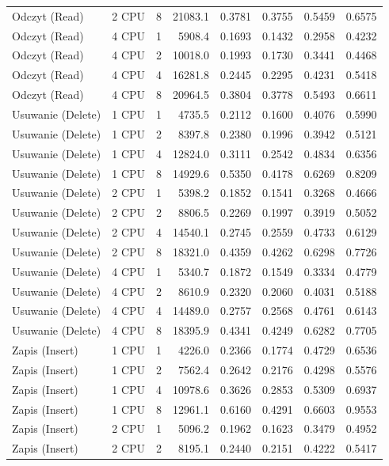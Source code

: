 \begin{table}[ht]
{\begin{tabular}{llcrrrrr}
Odczyt (Read) & 2 CPU & 8 & 21083.1 & 0.3781 & 0.3755 & 0.5459 & 0.6575 \\
Odczyt (Read) & 4 CPU & 1 & 5908.4 & 0.1693 & 0.1432 & 0.2958 & 0.4232 \\
Odczyt (Read) & 4 CPU & 2 & 10018.0 & 0.1993 & 0.1730 & 0.3441 & 0.4468 \\
Odczyt (Read) & 4 CPU & 4 & 16281.8 & 0.2445 & 0.2295 & 0.4231 & 0.5418 \\
Odczyt (Read) & 4 CPU & 8 & 20964.5 & 0.3804 & 0.3778 & 0.5493 & 0.6611 \\
Usuwanie (Delete) & 1 CPU & 1 & 4735.5 & 0.2112 & 0.1600 & 0.4076 & 0.5990 \\
Usuwanie (Delete) & 1 CPU & 2 & 8397.8 & 0.2380 & 0.1996 & 0.3942 & 0.5121 \\
Usuwanie (Delete) & 1 CPU & 4 & 12824.0 & 0.3111 & 0.2542 & 0.4834 & 0.6356 \\
Usuwanie (Delete) & 1 CPU & 8 & 14929.6 & 0.5350 & 0.4178 & 0.6269 & 0.8209 \\
Usuwanie (Delete) & 2 CPU & 1 & 5398.2 & 0.1852 & 0.1541 & 0.3268 & 0.4666 \\
Usuwanie (Delete) & 2 CPU & 2 & 8806.5 & 0.2269 & 0.1997 & 0.3919 & 0.5052 \\
Usuwanie (Delete) & 2 CPU & 4 & 14540.1 & 0.2745 & 0.2559 & 0.4733 & 0.6129 \\
Usuwanie (Delete) & 2 CPU & 8 & 18321.0 & 0.4359 & 0.4262 & 0.6298 & 0.7726 \\
Usuwanie (Delete) & 4 CPU & 1 & 5340.7 & 0.1872 & 0.1549 & 0.3334 & 0.4779 \\
Usuwanie (Delete) & 4 CPU & 2 & 8610.9 & 0.2320 & 0.2060 & 0.4031 & 0.5188 \\
Usuwanie (Delete) & 4 CPU & 4 & 14489.0 & 0.2757 & 0.2568 & 0.4761 & 0.6143 \\
Usuwanie (Delete) & 4 CPU & 8 & 18395.9 & 0.4341 & 0.4249 & 0.6282 & 0.7705 \\
Zapis (Insert) & 1 CPU & 1 & 4226.0 & 0.2366 & 0.1774 & 0.4729 & 0.6536 \\
Zapis (Insert) & 1 CPU & 2 & 7562.4 & 0.2642 & 0.2176 & 0.4298 & 0.5576 \\
Zapis (Insert) & 1 CPU & 4 & 10978.6 & 0.3626 & 0.2853 & 0.5309 & 0.6937 \\
Zapis (Insert) & 1 CPU & 8 & 12961.1 & 0.6160 & 0.4291 & 0.6603 & 0.9553 \\
Zapis (Insert) & 2 CPU & 1 & 5096.2 & 0.1962 & 0.1623 & 0.3479 & 0.4952 \\
Zapis (Insert) & 2 CPU & 2 & 8195.1 & 0.2440 & 0.2151 & 0.4222 & 0.5417 \\

\end{tabular}}
\end{table}
